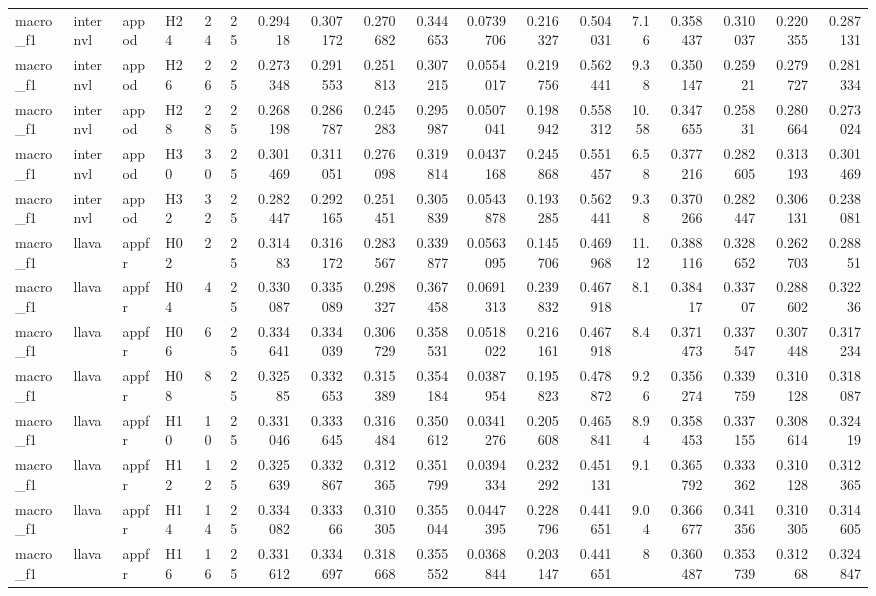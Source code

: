 \begin{longtable}{llllrrrrrrrrrrrrrr}
macro\_f1 & internvl & appod & H24 & 24 & 25 & 0.29418 & 0.307172 & 0.270682 & 0.344653 & 0.0739706 & 0.216327 & 0.504031 & 7.16 & 0.358437 & 0.310037 & 0.220355 & 0.287131 \\
macro\_f1 & internvl & appod & H26 & 26 & 25 & 0.273348 & 0.291553 & 0.251813 & 0.307215 & 0.0554017 & 0.219756 & 0.562441 & 9.38 & 0.350147 & 0.25921 & 0.279727 & 0.281334 \\
macro\_f1 & internvl & appod & H28 & 28 & 25 & 0.268198 & 0.286787 & 0.245283 & 0.295987 & 0.0507041 & 0.198942 & 0.558312 & 10.58 & 0.347655 & 0.25831 & 0.280664 & 0.273024 \\
macro\_f1 & internvl & appod & H30 & 30 & 25 & 0.301469 & 0.311051 & 0.276098 & 0.319814 & 0.0437168 & 0.245868 & 0.551457 & 6.58 & 0.377216 & 0.282605 & 0.313193 & 0.301469 \\
macro\_f1 & internvl & appod & H32 & 32 & 25 & 0.282447 & 0.292165 & 0.251451 & 0.305839 & 0.0543878 & 0.193285 & 0.562441 & 9.38 & 0.370266 & 0.282447 & 0.306131 & 0.238081 \\
macro\_f1 & llava & appfr & H02 & 2 & 25 & 0.31483 & 0.316172 & 0.283567 & 0.339877 & 0.0563095 & 0.145706 & 0.469968 & 11.12 & 0.388116 & 0.328652 & 0.262703 & 0.28851 \\
macro\_f1 & llava & appfr & H04 & 4 & 25 & 0.330087 & 0.335089 & 0.298327 & 0.367458 & 0.0691313 & 0.239832 & 0.467918 & 8.1 & 0.38417 & 0.33707 & 0.288602 & 0.32236 \\
macro\_f1 & llava & appfr & H06 & 6 & 25 & 0.334641 & 0.334039 & 0.306729 & 0.358531 & 0.0518022 & 0.216161 & 0.467918 & 8.4 & 0.371473 & 0.337547 & 0.307448 & 0.317234 \\
macro\_f1 & llava & appfr & H08 & 8 & 25 & 0.32585 & 0.332653 & 0.315389 & 0.354184 & 0.0387954 & 0.195823 & 0.478872 & 9.26 & 0.356274 & 0.339759 & 0.310128 & 0.318087 \\
macro\_f1 & llava & appfr & H10 & 10 & 25 & 0.331046 & 0.333645 & 0.316484 & 0.350612 & 0.0341276 & 0.205608 & 0.465841 & 8.94 & 0.358453 & 0.337155 & 0.308614 & 0.32419 \\
macro\_f1 & llava & appfr & H12 & 12 & 25 & 0.325639 & 0.332867 & 0.312365 & 0.351799 & 0.0394334 & 0.232292 & 0.451131 & 9.1 & 0.365792 & 0.333362 & 0.310128 & 0.312365 \\
macro\_f1 & llava & appfr & H14 & 14 & 25 & 0.334082 & 0.33366 & 0.310305 & 0.355044 & 0.0447395 & 0.228796 & 0.441651 & 9.04 & 0.366677 & 0.341356 & 0.310305 & 0.314605 \\
macro\_f1 & llava & appfr & H16 & 16 & 25 & 0.331612 & 0.334697 & 0.318668 & 0.355552 & 0.0368844 & 0.203147 & 0.441651 & 8 & 0.360487 & 0.353739 & 0.31268 & 0.324847 \\

\end{longtable}
